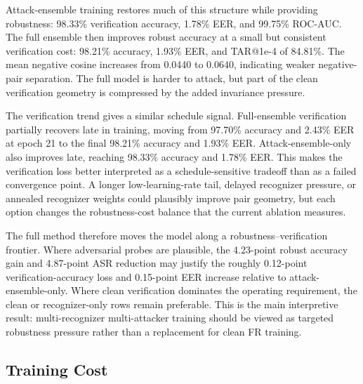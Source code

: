 \documentclass[conference]{IEEEtran}
\begin{document}
Attack-ensemble training restores much of this structure while providing
robustness: 98.33\% verification accuracy, 1.78\% EER, and 99.75\% ROC-AUC.
The full ensemble then improves robust accuracy at a small but consistent
verification cost: 98.21\% accuracy, 1.93\% EER, and TAR@1e-4 of 84.81\%.
The mean negative cosine increases from 0.0440 to 0.0640, indicating weaker
negative-pair separation. The full model is harder to attack, but part of the
clean verification geometry is compressed by the added invariance pressure.

The verification trend gives a similar schedule signal. Full-ensemble
verification partially recovers late in training, moving from 97.70\% accuracy
and 2.43\% EER at epoch 21 to the final 98.21\% accuracy and 1.93\% EER.
Attack-ensemble-only also improves late, reaching 98.33\% accuracy and
1.78\% EER. This makes the verification loss better interpreted as a
schedule-sensitive tradeoff than as a failed convergence point. A longer
low-learning-rate tail, delayed recognizer pressure, or annealed recognizer
weights could plausibly improve pair geometry, but each option changes the
robustness-cost balance that the current ablation measures.

The full method therefore moves the model along a robustness--verification
frontier. Where adversarial probes are plausible, the 4.23-point robust
accuracy gain and 4.87-point ASR reduction may justify the roughly 0.12-point
verification-accuracy loss and 0.15-point EER increase relative to
attack-ensemble-only. Where clean verification dominates the operating
requirement, the clean or recognizer-only rows remain preferable. This is the
main interpretive result: multi-recognizer multi-attacker training should be
viewed as targeted robustness pressure rather than a replacement for clean FR
training.

\subsection{Training Cost}
\end{document}
